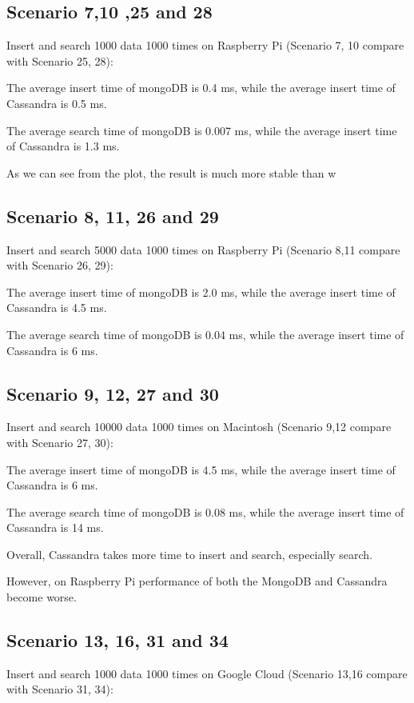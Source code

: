 \subsection{Scenario 7,10 ,25 and 28}
Insert and search 1000 data 1000 times on Raspberry Pi 
(Scenario 7, 10 compare with Scenario 25, 28):

The average insert time of mongoDB is 0.4 ms, while the average insert time of 
Cassandra is 0.5 ms.

The average search time of mongoDB is 0.007 ms, while the average 
insert time of 
Cassandra is 1.3 ms.

As we can see from the plot, the result is much more stable than w

\subsection{Scenario 8, 11, 26 and 29}
Insert and search 5000 data 1000 times on Raspberry Pi 
(Scenario 8,11 compare with Scenario 26, 29):

The average insert time of mongoDB is 2.0 ms, while the average insert time of 
Cassandra is 4.5 ms.

The average search time of mongoDB is 0.04 ms, while the average 
insert time of 
Cassandra is 6 ms.

\subsection{Scenario 9, 12, 27 and 30}
Insert and search 10000 data 1000 times on Macintosh 
(Scenario 9,12 compare with Scenario 27, 30):

The average insert time of mongoDB is 4.5 ms, while the average insert time of 
Cassandra is 6 ms.

The average search time of mongoDB is 0.08 ms, while the average
 insert time of 
Cassandra is 14 ms.

Overall, Cassandra takes more time to insert and search, especially search. 

However, on Raspberry Pi performance of  both the MongoDB and Cassandra 
become worse.



\subsection{Scenario 13, 16, 31 and 34}
Insert and search 1000 data 1000 times on Google Cloud
(Scenario 13,16 compare with Scenario 31, 34):

